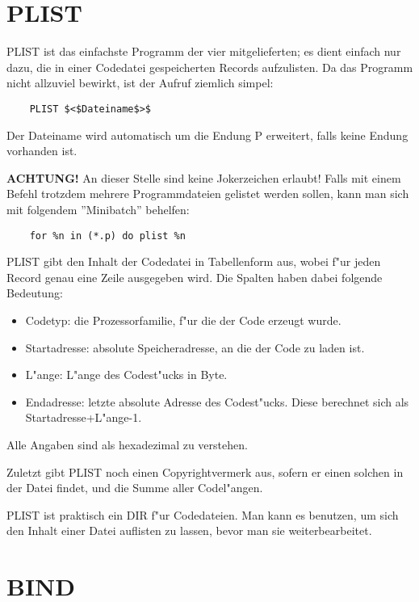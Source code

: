 \documentclass[12pt,a4paper,twoside]{report}
\newcommand{\bb}[1]{{\bf #1}}
\begin{document}

\section{PLIST}

PLIST ist das einfachste Programm der vier mitgelieferten; es dient
einfach nur dazu, die in einer Codedatei gespeicherten Records aufzulisten.
Da das Programm nicht allzuviel bewirkt, ist der Aufruf ziemlich simpel:
\begin{verbatim}
    PLIST $<$Dateiname$>$
\end{verbatim}
Der Dateiname wird automatisch um die Endung P erweitert, falls keine
Endung vorhanden ist.
\par
\bb{ACHTUNG!}  An dieser Stelle sind keine Jokerzeichen erlaubt! Falls mit
einem Befehl trotzdem mehrere Programmdateien gelistet werden sollen,
kann man sich mit folgendem ''Minibatch'' behelfen:
\begin{verbatim}
    for %n in (*.p) do plist %n
\end{verbatim}
PLIST gibt den Inhalt der Codedatei in Tabellenform aus, wobei f"ur
jeden Record genau eine Zeile ausgegeben wird.  Die Spalten haben
dabei folgende Bedeutung:
\begin{itemize}
\item{Codetyp: die Prozessorfamilie, f"ur die der Code erzeugt wurde.}
\item{Startadresse: absolute Speicheradresse, an die der Code zu laden ist.}
\item{L"ange: L"ange des Codest"ucks in Byte.}
\item{Endadresse: letzte absolute Adresse des Codest"ucks.  Diese berechnet
      sich als Startadresse+L"ange-1.}
\end{itemize}
Alle Angaben sind als hexadezimal zu verstehen.
\par
Zuletzt gibt PLIST noch einen Copyrightvermerk aus, sofern er einen
solchen in der Datei findet, und die Summe aller Codel"angen.
\par
PLIST ist praktisch ein DIR f"ur Codedateien.  Man kann es benutzen,
um sich den Inhalt einer Datei auflisten zu lassen, bevor man sie
weiterbearbeitet.


\section{BIND}
\end{document}
